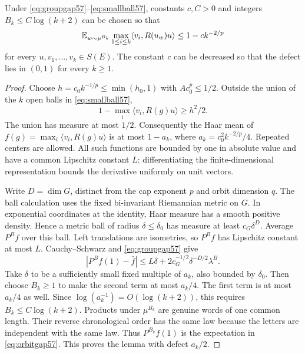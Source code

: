 \begin{lemma}\label{lem:orbitgap57}
Under \eqref{eq:groupgap57}--\eqref{eq:smallball57}, constants $c,C>0$ and integers $B_k\le C\log(k+2)$ can be chosen so that
\begin{equation}\label{eq:orbitgap57}
 \mathbb E_{w\sim\mu^{B_k}}\max_{1\le i\le k}
       \langle v_i,R(u_w)u\rangle\le1-c k^{-2/p}
\end{equation}
for every $u,v_1,\ldots,v_k\in S(E)$. The constant $c$ can be decreased so that the defect lies in $(0,1)$ for every $k\ge1$.
\end{lemma}
\begin{proof}
Choose $h=c_0k^{-1/p}\le\min(h_0,1)$ with $A c_0^p\le1/2$. Outside the union of the $k$ open balls in \eqref{eq:smallball57},
\[
 1-\max_i\langle v_i,R(g)u\rangle\ge h^2/2.
\]
The union has measure at most $1/2$. Consequently the Haar mean of
$f(g)=\max_i\langle v_i,R(g)u\rangle$ is at most $1-a_k$, where
$a_k=c_0^2k^{-2/p}/4$. Repeated centers are allowed. All such functions are bounded by one in absolute value and have a common Lipschitz constant $L$: differentiating the finite-dimensional representation bounds the derivative uniformly on unit vectors.

Write $D=\dim G$, distinct from the cap exponent $p$ and orbit dimension $q$. The ball calculation uses the fixed bi-invariant Riemannian metric on $G$. In exponential coordinates at the identity, Haar measure has a smooth positive density. Hence a metric ball of radius $\delta\le\delta_0$ has measure at least $c_G\delta^D$. Average $P^Bf$ over this ball. Left translations are isometries, so $P^Bf$ has Lipschitz constant at most $L$. Cauchy--Schwarz and \eqref{eq:groupgap57} give
\[
 |P^Bf(1)-\bar f|
 \le L\delta+2c_G^{-1/2}\delta^{-D/2}\lambda^B.
\]
Take $\delta$ to be a sufficiently small fixed multiple of $a_k$, also bounded by $\delta_0$. Then choose $B_k\ge1$ to make the second term at most $a_k/4$. The first term is at most $a_k/4$ as well. Since $\log(a_k^{-1})=O(\log(k+2))$, this requires $B_k\le C\log(k+2)$. Products under $\mu^{B_k}$ are genuine words of one common length. Their reverse chronological order has the same law because the letters are independent with the same law. Thus $P^{B_k}f(1)$ is the expectation in \eqref{eq:orbitgap57}. This proves the lemma with defect $a_k/2$.
\end{proof}

